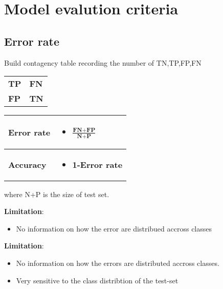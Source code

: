 \section{Model evalution criteria}
\subsection{Error rate}
Build contagency table recording the number of TN,TP,FP,FN
  \begin{table}[!h]
    \begin{center}
    \begin{tabular}{| m{5em}| m{5em}|}
    \hline
    \centering
    \cellcolor{vert.g} \textbf{TP} &  \cellcolor{red.g}\textbf{FN} \\ \centering \hline 
    \centering
    \cellcolor{red.g} \textbf{FP}  & \cellcolor{vert.g} \textbf{TN}
    \end{tabular}
    \end{center}
\end{table}



  \begin{table}[!h]
    \begin{center}
    \begin{tabular}{| m{5em}| m{8em}|}
    \hline
    \centering
    \rowcolor{vert.g} \textbf{Error rate} & \begin{itemize}
        \item $\frac{\textbf{FN+FP}}{\textbf{N+P}}$ 
    \end{itemize}  \\ \hline 
    \centering
    \rowcolor{red.g} \textbf{Accuracy}  &  \begin{itemize}
        \item \textbf{1-Error rate}
    \end{itemize}
    \end{tabular}
    \end{center}
\end{table}
where N+P is the size of test set.

\textbf{Limitation}:
\begin{itemize}
    \item No information on how the error are distribued accross classes
\end{itemize}
\textbf{Limitation}:
\begin{itemize}
    \item No information on how the errors are distributed accross classes.
    \item Very sensitive to the class distribtion of the test-set
\end{itemize}


